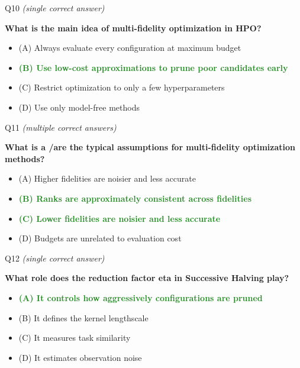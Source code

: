 \documentclass[main]{subfiles}
\newcommand{\correct}[1]{\textcolor{ForestGreen}{\textbf{#1} \checkmark}}
\newcommand{\wrong}[1]{#1}
\begin{document}
\begin{frame}{Q10 \hfill \small\normalfont\textit{(single correct answer)}}

\textbf{What is the main idea of multi-fidelity optimization in HPO?}

\begin{itemize}
    \item \wrong{(A) \; Always evaluate every configuration at maximum budget}
    \item \correct{(B) \; Use low-cost approximations to prune poor candidates early}
    \item \wrong{(C) \; Restrict optimization to only a few hyperparameters}
    \item \wrong{(D) \; Use only model-free methods}
\end{itemize}

\end{frame}
\begin{frame}{Q11 \hfill \small\normalfont\textit{(multiple correct answers)}}

\textbf{What is a /are the typical assumptions for multi-fidelity optimization methods?}

\begin{itemize}
    \item \wrong{(A) \; Higher fidelities are noisier and less accurate}
    \item \correct{(B) \; Ranks are approximately consistent across fidelities}
    \item \correct{(C) \; Lower fidelities are noisier and less accurate}
    \item \wrong{(D) \; Budgets are unrelated to evaluation cost}
\end{itemize}

\end{frame}
\begin{frame}{Q12 \hfill \small\normalfont\textit{(single correct answer)}}

\textbf{What role does the reduction factor eta in Successive Halving play?}

\begin{itemize}
    \item \correct{(A) \; It controls how aggressively configurations are pruned}
    \item \wrong{(B) \; It defines the kernel lengthscale}
    \item \wrong{(C) \; It measures task similarity}
    \item \wrong{(D) \; It estimates observation noise}
\end{itemize}

\end{frame}
\end{document}
